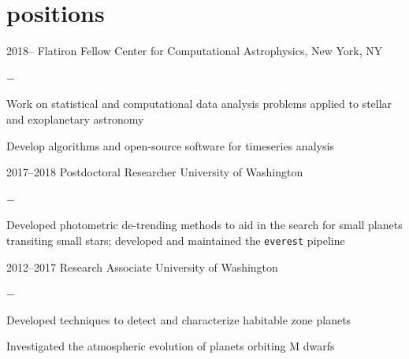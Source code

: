 \documentclass[]{luger-cv} %
\begin{document}

\section{positions}

\begin{entrylist}


    \entry
    {2018--}
    {Flatiron Fellow}
    {Center for Computational Astrophysics, New York, NY}
    {%
        \vspace{-1em}
        \begin{list}{{\color{numcolor}$-$}}{\cvlist}
            \item Work on statistical and computational data analysis problems
                  \ifdefined \onepage \else
                      applied to stellar and exoplanetary astronomy
                  \fi
            \item Develop algorithms and open-source software for timeseries analysis
        \end{list}
    }


    \entry
    {2017--2018}
    {Postdoctoral Researcher}
    {University of Washington}
    {%
        \vspace{-1em}
        \begin{list}{{\color{numcolor}$-$}}{\cvlist}
            \item Developed photometric de-trending methods to aid in the search for small
                  planets transiting small stars; developed and maintained the \texttt{everest} pipeline
        \end{list}
    }


    \entry
    {2012--2017}
    {Research Associate}
    {University of Washington}
    {%
        \vspace{-1em}
        \begin{list}{{\color{numcolor}$-$}}{\cvlist}
            \item Developed techniques to detect and characterize habitable
                  zone planets
            \item Investigated the atmospheric evolution of planets orbiting M dwarfs
        \end{list}
    }


\end{entrylist}
\end{document}
